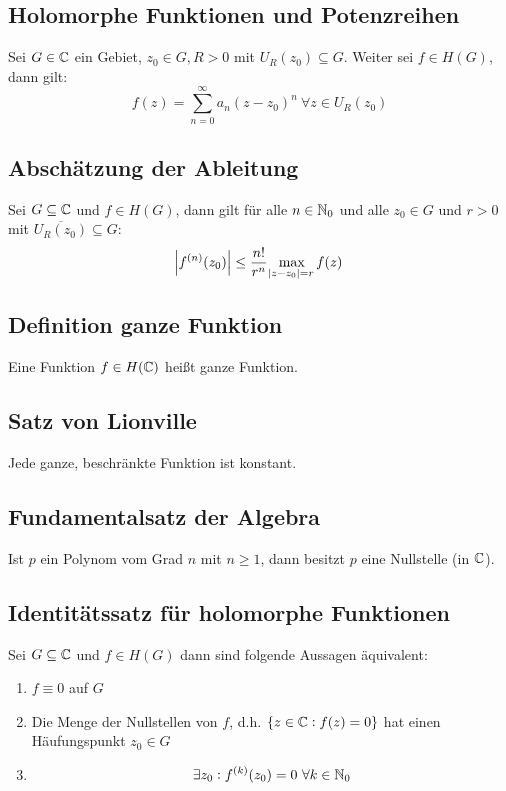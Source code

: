 \subsection{Holomorphe Funktionen und Potenzreihen}
Sei $G \in \mathbb{C}$ ein Gebiet, $z_0 \in G, R > 0$ mit $U_R(z_0) \subseteq G$. Weiter sei $f \in H(G)$, dann gilt:
\begin{equation*}
    f(z) = \sum_{n=0}^\infty a_n {(z-z_0)}^n\ \forall z \in U_R(z_0)
\end{equation*}

\subsection{Abschätzung der Ableitung}
Sei $G \subseteq \mathbb{C}$ und $f \in H(G)$, dann gilt für alle $n \in \mathbb{N}_0$ und alle $z_0 \in G$ und $r>0$ mit
$\overline{U_R(z_0)} \subseteq G$:
\begin{equation*}
    \abs{f^{(n)}(z_0)} \leq \frac{n!}{r^n} \max_{\abs{z-z_0} = r} f(z)
\end{equation*}

\subsection{Definition ganze Funktion}
Eine Funktion $f \in H(\mathbb{C})$ heißt ganze Funktion.

\subsection{Satz von Lionville}
Jede ganze, beschränkte Funktion ist konstant.

\subsection{Fundamentalsatz der Algebra}
Ist $p$ ein Polynom vom Grad $n$ mit $n \geq 1$, dann besitzt $p$ eine Nullstelle (in $\mathbb{C}$).

\subsection{Identitätssatz für holomorphe Funktionen}
Sei $G \subseteq \mathbb{C}$ und $f \in  H(G)$ dann sind folgende Aussagen äquivalent:
\begin{enumerate}
    \item $f \equiv 0$ auf $G$
    \item Die Menge der Nullstellen von $f$, d.h.
            $\{z \in \mathbb{C}: f(z) = 0\}$ hat einen Häufungspunkt $z_0 \in G$
    \item
        \begin{equation*}
            \exists z_0: f^{(k)}(z_0) = 0\ \forall k \in \N_0
        \end{equation*}
\end{enumerate}

